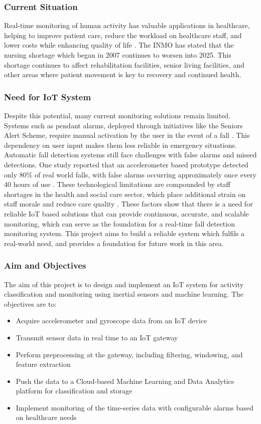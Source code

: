 \documentclass[conference]{IEEEtran}
\begin{document}
\subsubsection{Current Situation}
Real-time monitoring of human activity has valuable applications in healthcare, helping to improve patient care, reduce the workload on healthcare staff, and lower costs while enhancing quality of life \cite{b1}. The INMO has stated that the nursing shortage which began in 2007 continues to worsen into 2025\cite{inmo}. This shortage continues to affect rehabilitation facilities, senior living facilities, and other areas where patient movement is key to recovery and continued health.

\subsubsection{Need for IoT System}
Despite this potential, many current monitoring solutions remain limited. Systems such as pendant alarms, deployed through initiatives like the Seniors Alert Scheme, require manual activation by the user in the event of a fall \cite{b2}. This dependency on user input makes them less reliable in emergency situations. Automatic fall detection systems still face challenges with false alarms and missed detections. One study reported that an accelerometer based prototype detected only 80\% of real world falls, with false alarms occurring approximately once every 40 hours of use \cite{b3}. These technological limitations are compounded by staff shortages in the health and social care sector, which place additional strain on staff morale and reduce care quality \cite{b4}. These factors show that there is a need for reliable IoT based solutions that can provide continuous, accurate, and scalable monitoring, which can serve as the foundation for a real-time fall detection monitoring system. This project aims to build a reliable system which fulfils a real-world need, and provides a foundation for future work in this area.

\subsubsection{Aim and Objectives}\label{AO}
The aim of this project is to design and implement an IoT system for activity classification and monitoring using inertial sensors and machine learning. The objectives are to:
\begin{itemize}
	\item Acquire accelerometer and gyroscope data from an IoT device
	\item Transmit sensor data in real time to an IoT gateway
	\item Perform preprocessing at the gateway, including filtering, windowing, and feature extraction
	\item Push the data to a Cloud-based Machine Learning and Data Analytics platform for classification and storage
	\item Implement monitoring of the time-series data with configurable alarms based on healthcare needs
\end{itemize}
\end{document}
